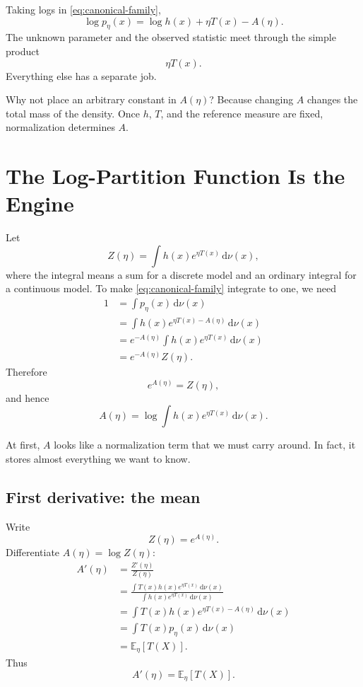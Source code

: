\documentclass[en,nofont,11pt]{elegantbook}
\newcommand{\E}{\mathbb{E}}
\newcommand{\dd}{\mathrm{d}}
\begin{document}
Taking logs in \eqref{eq:canonical-family},
\[
\log p_\eta(x)
=
\log h(x)+\eta T(x)-A(\eta).
\]
The unknown parameter and the observed statistic meet through the simple product
\[
\eta T(x).
\]
Everything else has a separate job.

\begin{thinkbox}
Why not place an arbitrary constant in $A(\eta)$? Because changing $A$ changes the total mass of the density. Once $h$, $T$, and the reference measure are fixed, normalization determines $A$.
\end{thinkbox}

\chapter{The Log-Partition Function Is the Engine}

Let
\[
Z(\eta)
=
\int h(x)e^{\eta T(x)}\,\dd\nu(x),
\]
where the integral means a sum for a discrete model and an ordinary integral for a continuous model. To make \eqref{eq:canonical-family} integrate to one, we need
\begin{align*}
1
&=\int p_\eta(x)\,\dd\nu(x)\\
&=\int h(x)e^{\eta T(x)-A(\eta)}\,\dd\nu(x)\\
&=e^{-A(\eta)}\int h(x)e^{\eta T(x)}\,\dd\nu(x)\\
&=e^{-A(\eta)}Z(\eta).
\end{align*}
Therefore
\[
e^{A(\eta)}=Z(\eta),
\]
and hence
\begin{equation}
\boxed{
A(\eta)
=
\log\int h(x)e^{\eta T(x)}\,\dd\nu(x).
}
\label{eq:log-partition}
\end{equation}

At first, $A$ looks like a normalization term that we must carry around. In fact, it stores almost everything we want to know.

\section{First derivative: the mean}

Write
\[
Z(\eta)=e^{A(\eta)}.
\]
Differentiate $A(\eta)=\log Z(\eta)$:
\begin{align*}
A'(\eta)
&=\frac{Z'(\eta)}{Z(\eta)}\\
&=\frac{\int T(x)h(x)e^{\eta T(x)}\,\dd\nu(x)}
        {\int h(x)e^{\eta T(x)}\,\dd\nu(x)}\\
&=\int T(x)h(x)e^{\eta T(x)-A(\eta)}\,\dd\nu(x)\\
&=\int T(x)p_\eta(x)\,\dd\nu(x)\\
&=\E_\eta[T(X)].
\end{align*}
Thus
\begin{equation}
\boxed{A'(\eta)=\E_\eta[T(X)].}
\label{eq:first-derivative}
\end{equation}
\end{document}
